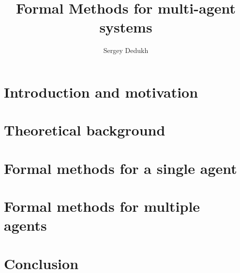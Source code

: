 \documentclass{../template/llncs}
\title{Formal Methods for multi-agent systems}
\author{Sergey Dedukh}
\institute{University of Koblenz and Landau}
\begin{document}
\maketitle

\section{Introduction and motivation}


\section{Theoretical background}


\section{Formal methods for a single agent}


\section{Formal methods for multiple agents}


\section{Conclusion}




\end{document}
